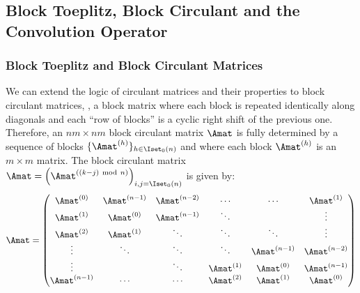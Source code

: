 \subsection{Block Toeplitz, Block Circulant and the Convolution Operator}
\label{subsection:ch2-block_toeplitz_and_block_circulant_matrices}

\subsubsection{Block Toeplitz and Block Circulant Matrices}
\label{subsubsection:ch2-block_circulant_and_block_toeplitz_matrices}

We can extend the logic of circulant matrices and their properties to block circulant matrices, \ie, a block matrix where each block is repeated identically along diagonals and each ``row of blocks'' is a cyclic right shift of the previous one.
Therefore, an $nm \times nm$ block circulant matrix $\Amat$ is fully determined by a sequence of blocks $\{\Amat^{(h)}\}_{h \in \Iset_0(n)}$ and where each block $\Amat^{(h)}$ is an $m \times m$ matrix.
The block circulant matrix $\Amat = \leftmat \Amat^{((k-j) \mod n)} \rightmat_{i, j = \Iset_0(n)} $ is given by:
\begin{equation}
  \Amat = 
  \leftmatrix
    \Amat^{(0)}   & \Amat^{(n-1)} & \Amat^{(n-2)} & \cdots      & \cdots        & \Amat^{(1)}   \\
    \Amat^{(1)}   & \Amat^{(0)}   & \Amat^{(n-1)} & \ddots      &               & \vdots        \\
    \Amat^{(2)}   & \Amat^{(1)}   & \ddots        & \ddots      & \ddots        & \vdots        \\ 
    \vdots        & \ddots        & \ddots        & \ddots      & \Amat^{(n-1)} & \Amat^{(n-2)} \\
    \vdots        &               & \ddots        & \Amat^{(1)} & \Amat^{(0)}   & \Amat^{(n-1)} \\
    \Amat^{(n-1)} & \cdots        & \cdots        & \Amat^{(2)} & \Amat^{(1)}   & \Amat^{(0)}
  \rightmatrix
\end{equation}

